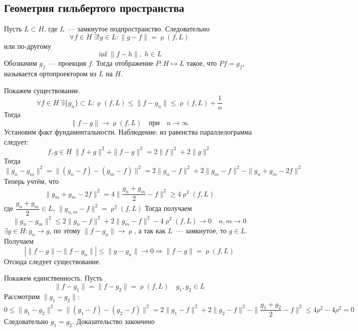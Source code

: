 \documentclass[14pt]{extarticle}
\DeclareMathOperator{\rh}{\rho}
\begin{document}
\subsection*{Геометрия гильбертого пространства}
\begin{Theor}
    Пусть $L \subset H$, где $L$~--- замкнутое подпространство.
    Следовательно
    $$
    \forall f \in H\; \exists! g \in L\colon \|g - f\| = \rh(f, L)
    $$ 
    или по-другому 
    $$
    \inf\|f - h\|, \;h\in L
    $$
    Обозначим $g_f$~--- проекция $f$.
    Тогда отображение $P:H \mapsto L$ такое, что $Pf = g_f$, называется ортопроектором из $L$ на $H$.
\end{Theor}
\begin{Proof}
    Покажем существование.
    $$
    \forall f \in H\;\exists \{g_n\} \subset L\colon \rh(f, L) \le \|f-g_n\| \le \rh(f,L) + \dfrac{1}{n}
    $$
    Тогда
    $$
    \|f - g\| \to \rh(f,L)\quad \text{при} \quad n \to \infty
    $$
    Установим факт фундаментальности.
    Наблюдение: из равенства параллелограмма следует:
    $$
    f, g\in H\;\|f + g\|^2 + \|f - g\|^2 = 2\|f\|^2 + 2\|g\|^2
    $$
    Тогда
    $$
    \|g_n - g_m\|^2 = \|(g_n - f) - (g_m - f)\|^2 = 2\|g_n - f\|^2 + 2\|g_m - f\|^2 - \|g_n + g_m - 2f\|^2
    $$
    Теперь учтём, что
    $$
    \|g_m+g_m-2f\|^2 = 4\|\dfrac{g_n + g_m}{2} - f\|^2 \ge 4\rh^2(f, L)
    $$
    где $\dfrac{g_n + g_m}{2} \in L$, $\|g_{n,m} - f\|^2 = \rh^2(f, L)$
    Тогда получаем
    $$
    \|g_n - g_m\|^2 \le 2\|g_n - f\|^2 + 2\|g_m - f\|^2 - 4\rh^2(f,L) \to 0 \quad n,m \to 0
    $$
    $\exists g \in H\colon g_n \to g$, по этому $\|f - g_n\| \to \rh$, а так как $L$~--- замкнутое, то $g \in L$.
    Получаем 
    $$
    |\|f - g\| - \|f - g_n\|| \le \|g - g_n\| \to 0 \Rightarrow \|f-g\| = \rh(f,L)
    $$
    Отсюда следует существование.
    
    Покажем единственность.
    Пусть
    $$
    \|f - g_1\| = \|f - g_2\| = \rh(f, L)\quad g_1, g_2 \in L
    $$
    Рассмотрим $\|g_1 - g_2\|$:
    $$
    0 \le \|g_1 - g_2\|^2 = \|(g_1 - f) - (g_2 - f)\|^2 = 2\|g_1 - f\|^2 + 2\|g_2 - f\|^2 - \|\dfrac{g_1 + g_2}{2} - f\|^2 \le 4\rho^2 - 4\rho^2 = 0
    $$
    Следовательно $g_1 = g_2$.
    Доказательство закончено
\end{Proof}
\end{document}
